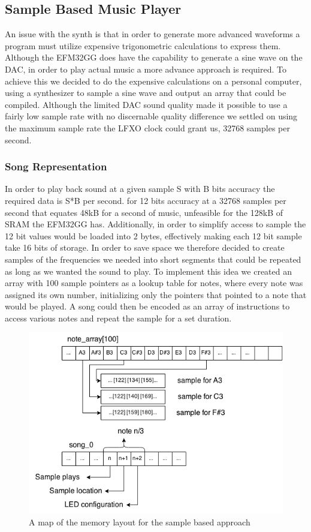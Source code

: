 \subsection{Sample Based Music Player}\label{sec:sample-based-music-player}
An issue with the synth is that in order to generate more advanced waveforms a program must utilize expensive trigonometric calculations to express them. Although the EFM32GG does have the capability to generate a sine wave on the DAC, in order to play actual music a more advance approach is required. To achieve this we decided to do the expensive calculations on a personal computer, using a synthesizer to sample a sine wave and output an array that could be compiled. Although the limited DAC sound quality made it possible to use a fairly low sample rate with no discernable quality difference we settled on using the maximum sample rate the LFXO clock could grant us, 32768 samples per second. 

\subsubsection{Song Representation}
In order to play back sound at a given sample S with B bits accuracy the required data is S*B per second. for 12 bits accuracy at a 32768 samples per second that equates 48kB for a second of music, unfeasible for the 128kB of SRAM the EFM32GG has. Additionally, in order to simplify access to sample the 12 bit values would be loaded into 2 bytes, effectively making each 12 bit sample take 16 bits of storage. In order to save space we therefore decided to create samples of the frequencies we needed into short segments that could be repeated as long as we wanted the sound to play. To implement this idea we created an array with 100 sample pointers as a lookup table for notes, where every note was assigned its own number, initializing only the pointers that pointed to a note that would be played. A song could then be encoded as an array of instructions to access various notes and repeat the sample for a set duration.


\begin{figure}[ht]
  \centering
  \includegraphics[width=\textwidth]{images/sample_array_layout.png}
  \caption{A map of the memory layout for the sample based approach}\label{fig:array_layout}
\end{figure}

